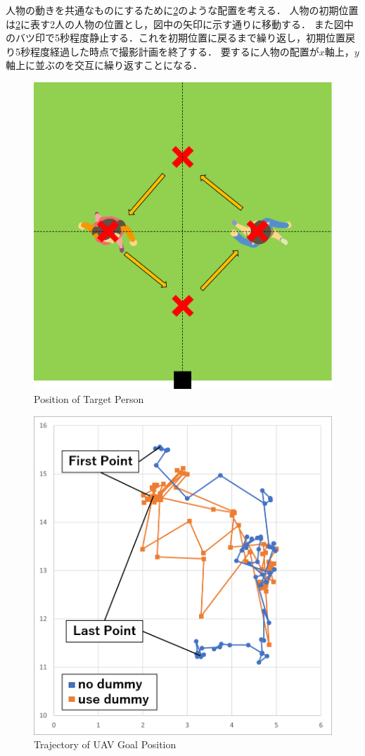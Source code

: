 \documentclass[autodetect-engine,dvipdfmx-if-dvi,ja=standard,a4j,jbase=11pt,magstyle=nomag*]{bxjsreport}
\begin{document}
人物の動きを共通なものにするために\cref{fig:pos_person}のような配置を考える．
人物の初期位置は\cref{fig:pos_person}に表す2人の人物の位置とし，図中の矢印に示す通りに移動する．
また図中のバツ印で5秒程度静止する．これを初期位置に戻るまで繰り返し，初期位置戻り5秒程度経過した時点で撮影計画を終了する．
要するに人物の配置が$x$軸上，$y$軸上に並ぶのを交互に繰り返すことになる．

\begin{figure}[h]
    \centering
    \includegraphics[width=0.5\linewidth, clip]{./figure/chapter5/experience_setting.png}
    \caption{Position of Target Person}
    \label{fig:pos_person}
\end{figure}

\begin{figure}[h]
    \centering
    \includegraphics[width=0.7\linewidth, clip]{./figure/chapter5/goal_graph.png}
    \caption{Trajectory of UAV Goal Position}
    \label{fig:pos_person}
\end{figure}
\end{document}
